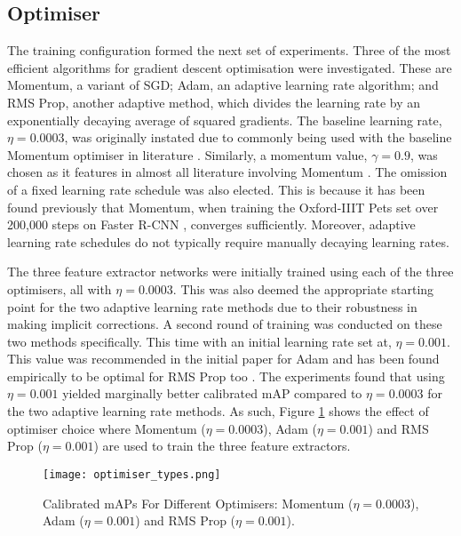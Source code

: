 \documentclass[journal]{IEEEtran}
\begin{document}
\subsection{Optimiser}

The training configuration formed the next set of experiments. Three of the most efficient algorithms for gradient descent optimisation were investigated. These are Momentum, a variant of SGD; Adam, an adaptive learning rate algorithm; and RMS Prop, another adaptive method, which divides the learning rate by an exponentially decaying average of squared gradients. The baseline learning rate, $\eta = 0.0003$, was originally instated due to commonly being used with the baseline Momentum optimiser in literature \cite{imagenet}. Similarly, a momentum value, $\gamma=0.9$, was chosen as it features in almost all literature involving Momentum \cite{fasterrcnn, tinyfaces, inceptionv2}. The omission of a fixed learning rate schedule was also elected. This is because it has been found previously that Momentum, when training the Oxford-IIIT Pets set over 200,000 steps on Faster R-CNN \cite{modelzoo}, converges sufficiently. Moreover, adaptive learning rate schedules do not typically require manually decaying learning rates.

The three feature extractor networks were initially trained using each of the three optimisers, all with $\eta = 0.0003$. This was also deemed the appropriate starting point for the two adaptive learning rate methods due to their robustness in making implicit corrections. A second round of training was conducted on these two methods specifically. This time with an initial learning rate set at, $\eta = 0.001$. This value was recommended in the initial paper for Adam \cite{adam} and has been found empirically to be optimal for RMS Prop too \cite{optimiserreviewpaper}. The experiments found that using $\eta = 0.001$ yielded marginally better calibrated mAP compared to $\eta = 0.0003$ for the two adaptive learning rate methods. As such, Figure \ref{fig:optimiser_types} shows the effect of optimiser choice where Momentum ($\eta = 0.0003$), Adam ($\eta = 0.001$) and RMS Prop ($\eta = 0.001$) are used to train the three feature extractors.

\begin{figure}[H]
    \centering
    \texttt{[image: optimiser\_types.png]}
    \caption{Calibrated mAPs For Different Optimisers: Momentum ($\eta = 0.0003$), Adam ($\eta = 0.001$) and RMS Prop ($\eta = 0.001$).}
    \label{fig:optimiser_types}
\end{figure}
\end{document}
